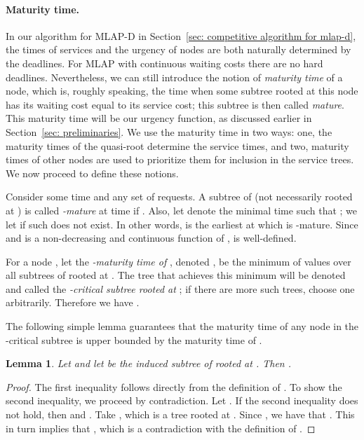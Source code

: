 \documentclass[a4paper]{article}
\newtheorem{lemma}[theorem]{Lemma}
\newcommand{\MLAP}{\mbox{\rm\textsf{MLAP}}}
\newcommand{\MLAPD}{\mbox{\rm\textsf{MLAP-D}}}
\begin{document}
\paragraph{Maturity time.}

In our algorithm for {\MLAPD} in Section~\ref{sec: competitive algorithm for mlap-d}, 
the times of services and the
urgency of nodes are both naturally determined by the deadlines. For
{\MLAP} with continuous waiting costs there are no hard deadlines. 
Nevertheless, we can still introduce the notion of \emph{maturity
  time} of a node, which is, roughly speaking, the time when some 
subtree rooted at this node has its waiting cost equal to its
service cost; this subtree is then called \emph{mature}.
This maturity time will be our urgency function, as discussed 
earlier in Section~\ref{sec: preliminaries}. We use the maturity
time in two ways: one, the maturity times of the 
quasi-root determine the service times, and two, maturity times
of other nodes are used to prioritize them for inclusion in
the service trees. We now proceed to define these notions.

Consider some time  and any set  of requests. A
subtree  of  (not necessarily rooted at ) is called
\emph{-mature} at time  if .
Also, let  denote the minimal time  such
that ; we let  if such  does not exist. In other words,
 is the earliest  at which  is
-mature. Since  and  is a
non-decreasing and continuous function of ,  is
well-defined.

For a node , let the \emph{-maturity time of }, denoted
, be the minimum of values 
over all subtrees  of  rooted at .  The tree  that
achieves this minimum will be denoted  and called the
\emph{-critical subtree rooted at }; if there are more such trees,
choose one arbitrarily. Therefore we have
.

The following simple lemma guarantees that the maturity time of any
node in the -critical subtree  is upper bounded by the maturity time of .


\begin{lemma}
\label{lem: maturity-critical}
Let  and let  be the induced subtree of 
 rooted at . Then 
.
\end{lemma}


\begin{proof}
The first inequality follows directly from the definition of . 
To show the second inequality, we proceed by contradiction. 
Let .
If the second inequality does not
hold, then  and . 
Take , which is a tree rooted at .
Since , we have that 
. 
This in turn implies that , which is a
contradiction with the definition of .
\end{proof}
\end{document}
